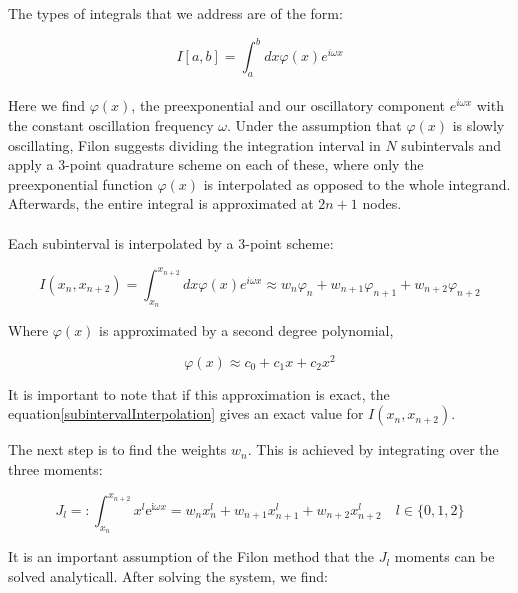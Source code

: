 The types of integrals that we address are of the form:

\begin{equation}
    I[a,b] = \int_a^b dx \varphi(x)e^{i\omega x}\label{oscillatoryIntegral}
\end{equation}

\paragraph{}Here we find $\varphi(x)$, the preexponential and our oscillatory component $e^{i\omega x}$ with the constant oscillation frequency $\omega$.
Under the assumption that $\varphi(x)$ is slowly oscillating, Filon suggests dividing the integration interval in $N$ subintervals and apply a 3-point quadrature scheme on each of these, where only the preexponential function $\varphi(x)$ is interpolated as opposed to the whole integrand.
Afterwards, the entire integral is approximated at $2n+1$ nodes. 

\paragraph{}Each subinterval is interpolated by a 3-point scheme:

\begin{equation}
    I(x_n,x_{n+2}) = \int_{x_n}^{x_{n+2}} dx \varphi(x)e^{i\omega x} \approx w_n\varphi_n+w_{n+1}\varphi_{n+1}+w_{n+2}\varphi_{n+2}\label{subintervalInterpolation}
\end{equation}

Where $\varphi(x)$ is approximated by a second degree polynomial, 

\begin{equation}
    \varphi(x) \approx c_0 + c_1x + c_2x^2\label{IntegrandAproximation}
\end{equation}

It is important to note that if this approximation is exact, the equation\eqref{subintervalInterpolation} gives an exact value for $I(x_n,x_{n+2})$.

The next step is to find the weights $w_n$. This is achieved by integrating over the three moments: 

\begin{equation}
    J_{l}=:\int_{x_{n}}^{x_{n+2}} x^{l} \mathrm{e}^{\mathrm{i} \omega x}=w_{n} x_{n}^{l}+w_{n+1} x_{n+1}^{l}+w_{n+2} x_{n+2}^{l} \quad l \in\{0,1,2\}
\end{equation}

It is an important assumption of the Filon method that the $J_l$ moments can be solved analyticall.  
After solving the system, we find: 

